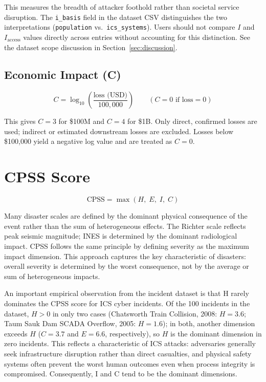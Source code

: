 \documentclass[11pt]{article}
\begin{document}
This measures the breadth of attacker foothold rather than
societal service disruption. The \texttt{i\_basis} field in the
dataset CSV distinguishes the two interpretations
(\texttt{population} vs.\ \texttt{ics\_systems}).
Users should not compare $I$ and $I_\text{access}$ values directly
across entries without accounting for this distinction.
See the dataset scope discussion in Section~\ref{sec:discussion}.

\subsection{Economic Impact (C)}

\begin{equation}
  C = \log_{10}\!\left(\frac{\text{loss (USD)}}{100{,}000}\right)
  \qquad (C = 0 \text{ if loss} = 0)
  \label{eq:C}
\end{equation}

This gives $C = 3$ for \$100M and $C = 4$ for \$1B. Only direct, confirmed
losses are used; indirect or estimated downstream losses are excluded.
Losses below \$100{,}000 yield a negative log value and are treated as $C = 0$.

\section{CPSS Score}

\begin{equation}
  \text{CPSS} = \max(H,\; E,\; I,\; C)
  \label{eq:cpss}
\end{equation}

Many disaster scales are defined by the dominant physical consequence
of the event rather than the sum of heterogeneous effects.
The Richter scale reflects peak seismic magnitude;
INES is determined by the dominant radiological impact.
CPSS follows the same principle by defining severity as the maximum
impact dimension.
This approach captures the key characteristic of disasters:
overall severity is determined by the worst consequence,
not by the average or sum of heterogeneous impacts.

An important empirical observation from the incident dataset is that
H rarely dominates the CPSS score for ICS cyber incidents.
Of the 100 incidents in the dataset, $H > 0$ in only two cases
(Chatsworth Train Collision, 2008: $H = 3.6$;
Taum Sauk Dam SCADA Overflow, 2005: $H = 1.6$);
in both, another dimension exceeds $H$
($C = 3.7$ and $E = 6.6$, respectively),
so $H$ is the dominant dimension in zero incidents.
This reflects a characteristic of ICS attacks: adversaries generally
seek infrastructure disruption rather than direct casualties,
and physical safety systems often prevent the worst human outcomes
even when process integrity is compromised.
Consequently, I and C tend to be the dominant dimensions.
\end{document}
